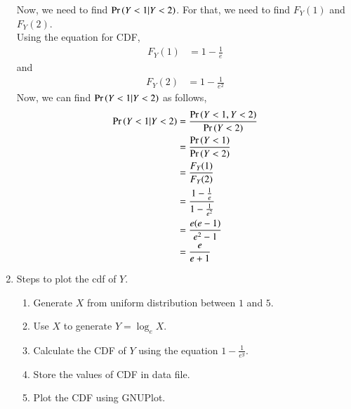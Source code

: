 \documentclass[journal,11pt]{IEEEtran}
\begin{document}
\begin{enumerate}
Now, we need to find $\Pr\left(Y<1 | Y<2 \right)$.
For that, we need to find $F_Y(1)$ and $F_Y(2)$.\\
Using the equation for CDF,
\begin{align}
    F_Y(1) & = 1 - \frac{1}{e}
\end{align}
and
\begin{align}
    F_Y(2) & = 1 - \frac{1}{e^2}
\end{align}
Now, we can find $\Pr\left(Y<1 | Y<2 \right)$ as follows,
\begin{align}
    \Pr\left(Y<1 | Y<2 \right) & = \frac{\Pr\left(Y<1 , Y<2\right)}{\Pr\left(Y<2\right)}           \\
                    & = \frac{\Pr\left(Y<1\right)}{\Pr\left(Y<2\right)}                 \\
                    & = \frac{F_Y(1)}{F_Y(2)}                     \\
                    & = \frac{1 - \frac{1}{e}}{1 - \frac{1}{e^2}} \\
                    & = \frac{e(e-1)}{e^2-1}                      \\
                    & = \frac{e}{e+1}
\end{align}

\item Steps to plot the cdf of $Y$.
\begin{enumerate}
    \item Generate $X$ from uniform distribution between $1$ and $5$.
    \item Use $X$ to generate $Y = \log_e X$.
    \item Calculate the CDF of $Y$ using the equation $1-\frac{1}{e^y}$.
    \item Store the values of CDF in data file.
    \item Plot the CDF using GNUPlot.
\end{enumerate}
\end{enumerate}                                 
\end{document}
